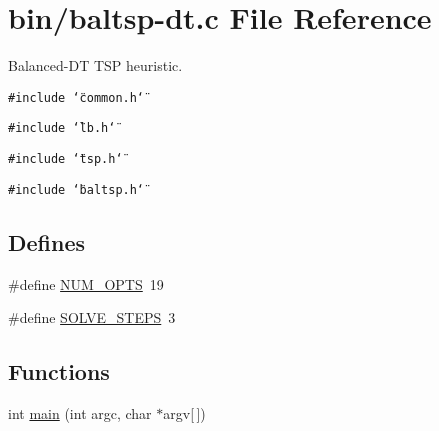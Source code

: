 \hypertarget{bin_2baltsp-dt_8c}{
\section{bin/baltsp-dt.c File Reference}
\label{bin_2baltsp-dt_8c}
}
Balanced-DT TSP heuristic.  


{\tt \#include \char`\"{}common.h\char`\"{}}\par
{\tt \#include \char`\"{}lb.h\char`\"{}}\par
{\tt \#include \char`\"{}tsp.h\char`\"{}}\par
{\tt \#include \char`\"{}baltsp.h\char`\"{}}\par
\subsection*{Defines}
\begin{CompactItemize}
\item 
\#define \hyperlink{bin_2baltsp-dt_8c_9b58b2c4af931c8486a986c9deca40f5}{NUM\_\-OPTS}~19
\item 
\#define \hyperlink{bin_2baltsp-dt_8c_ceebcce8f411269df7b99e78247d7497}{SOLVE\_\-STEPS}~3
\end{CompactItemize}
\subsection*{Functions}
\begin{CompactItemize}
\item 
int \hyperlink{bin_2baltsp-dt_8c_0ddf1224851353fc92bfbff6f499fa97}{main} (int argc, char $\ast$argv\mbox{[}$\,$\mbox{]})
\end{CompactItemize}
